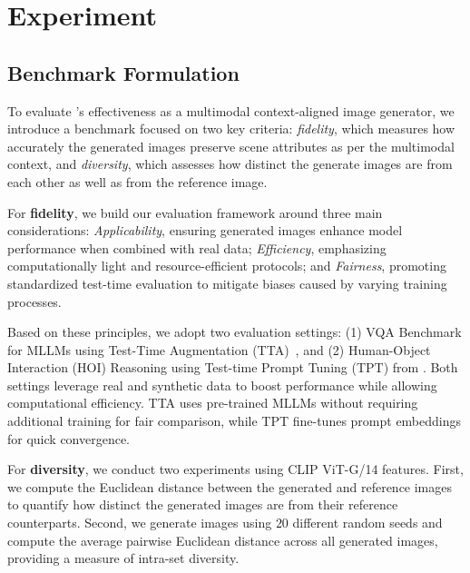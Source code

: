 \vspace{-1mm}
\section{Experiment}
\vspace{-1mm}
\subsection{Benchmark Formulation} 
\label{sec:benchmark_formulation}
To evaluate \method's effectiveness as a multimodal context-aligned image generator, we introduce a benchmark focused on two key criteria: \textit{fidelity}, which measures how accurately the generated images preserve scene attributes as per the multimodal context, and \textit{diversity}, which assesses how distinct the generate images are from each other as well as from the reference image.

For \textbf{fidelity}, we build our evaluation framework around three main considerations: \textit{Applicability}, ensuring generated images enhance model performance when combined with real data; \textit{Efficiency}, emphasizing computationally light and resource-efficient protocols; and \textit{Fairness}, promoting standardized test-time evaluation to mitigate biases caused by varying training processes.

Based on these principles, we adopt two evaluation settings: (1) VQA Benchmark for MLLMs using Test-Time Augmentation (TTA)~\citep{shanmugam2021better}, and (2) Human-Object Interaction (HOI) Reasoning using Test-time Prompt Tuning (TPT) from \citet{shu2022testtime}. Both settings leverage real and synthetic data to boost performance while allowing computational efficiency. TTA uses pre-trained MLLMs without requiring additional training for fair comparison, while TPT fine-tunes prompt embeddings for quick convergence.

For \textbf{diversity}, we conduct two experiments using CLIP ViT-G/14 \citep{radford2021learning} features. First, we compute the Euclidean distance between the generated and reference images to quantify how distinct the generated images are from their reference counterparts. Second, we generate images using $20$ different random seeds and compute the average pairwise Euclidean distance across all generated images, providing a measure of intra-set diversity.

